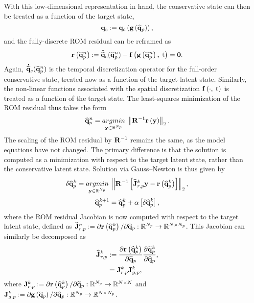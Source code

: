 With this low-dimensional representation in hand, the conservative state can then be treated as a function of the target state,
%
\begin{equation}\label{eq:consFuncTarget}
    \mathbf{q}_{c} := \mathbf{q}_{c} \left(\mathbf{g} \left(\mathbf{\widehat{q}}_{p}\right)\right),
\end{equation}
%
and the fully-discrete ROM residual can be reframed as
%
\begin{equation}
    \mathbf{r}\left(\mathbf{\widehat{q}}_{p}^{n}\right) := \accentset{\mbox{\large\bfseries .}}{\mathbf{\widetilde{q}}}_{c}(\mathbf{\widehat{q}}_{p}^{n}) - \mathbf{f} \left(\mathbf{g} \left(\mathbf{\widehat{q}}_{p}^{n}\right), \; \text{t}\right) = \mathbf{0}.
\end{equation}
%
Again, $\accentset{\mbox{\large\bfseries .}}{\mathbf{\widetilde{q}}}_{c}(\mathbf{\widehat{q}}_{p}^{n})$ is the temporal discretization operator for the full-order conservative state, treated now as a function of the target latent state. Similarly, the non-linear functions associated with the spatial discretization $ \mathbf{f} \left(\cdot, \; \text{t}\right)$ is treated as a function of the target state. The least-squares minimization of the ROM residual thus takes the form
%
\begin{equation}\label{eq:mplsvtLS}
    \primVecCoef^{\timeIdx} = \argmin{\dummyVec \inROne{\numPrimModes}} \left\Vert \resScaleInv \resFunc{\dummyVec} \right\Vert_2.
\end{equation}
%
The scaling of the ROM residual by $\resScaleInv$ remains the same, as the model equations have not changed. The primary difference is that the solution is computed as a minimization with respect to the target latent state, rather than the conservative latent state. Solution via Gauss--Newton is thus given by
%
\begin{equation}\label{eq:mplsvtLSLin}
    \delta \primVecCoef^{\newtonIdx} = \argmin{\dummyVec \inROne{\numPrimModes}} \left\Vert \resScaleInv \left[\jacobResCoefPrim^{\newtonIdx} \dummyVec - \resFunc{\primVecCoef^{\newtonIdx}}\right] \right\Vert_2,
\end{equation}
\begin{equation}
    \mathbf{\widehat{q}}_{p}^{k + 1} = \mathbf{\widehat{q}}_{p}^{k} + \alpha \left[ \delta \mathbf{\widehat{q}}_{p}^{k} \right],
\end{equation}
%
where the ROM residual Jacobian is now computed with respect to the target latent state, defined as $\mathbf{\widehat{J}}_{r,p}^{n} := \partial \mathbf{r}\left(\mathbf{\widehat{q}}_{p}^{k}\right) / \partial \mathbf{\widehat{q}}_{p}: \mathbb{R}^{N_p} \rightarrow \mathbb{R}^{N \times N_p}$. This Jacobian can similarly be decomposed as
%
\begin{align}
    \mathbf{\widehat{J}}_{r,p}^{k} &:= \frac{\partial \mathbf{r}\left(\mathbf{\widehat{q}}_{p}^{k}\right)}{\partial \mathbf{\widetilde{q}}_{p}} \frac{\partial \mathbf{\widetilde{q}}_{p}^{k}}{\partial \mathbf{\widehat{q}}_{p}}, \\
    &= \mathbf{J}_{r,p}^{k} \mathbf{J}_{g,p}^{k},
\end{align}
%
where $\mathbf{J}_{r,p}^{k} := \partial \mathbf{r}\left(\mathbf{\widehat{q}}_{p}^{k}\right) / \partial \mathbf{\widetilde{q}}_{p}: \mathbb{R}^{N_p} \rightarrow \mathbb{R}^{N \times N}$ and $\mathbf{J}_{g,p}^{k} := \partial \mathbf{g} \left(\mathbf{\widehat{q}}_{p}\right) / \partial \mathbf{\widehat{q}}_{p}: \mathbb{R}^{N_p} \rightarrow \mathbb{R}^{N \times N_p}$.

